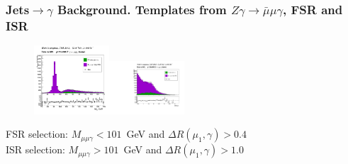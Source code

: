 \begin{frame}\frametitle{Jets$\rightarrow \gamma$ Background. Templates from $Z\gamma\rightarrow{\bar{\mu}}\mu\gamma$, FSR and ISR}
  \begin{figure}[htb]
    \begin{center}
       \includegraphics[width=0.25\textwidth]{../figs/figs_v11/MUON_ZGamma/PrepareYields/c_TotalDATAvsMC_Barrel__MpholeplepVERY_PRELIMINARY_pt15to500_.png}\includegraphics[width=0.25\textwidth]{../figs/figs_v11/MUON_ZGamma/PrepareYields/c_TotalDATAvsMC_Barrel__lep1PhoDeltaRVERY_PRELIMINARY_pt15to500_.pdf}\\
    \end{center}
  \end{figure}
\scriptize
FSR selection: $M_{\mu\mu\gamma}<101$~GeV and $\Delta R(\mu_{1},\gamma)>0.4$\\
ISR selection: $M_{\mu\mu\gamma}>101$~GeV and $\Delta R(\mu_{1},\gamma)>1.0$
\end{frame}%

